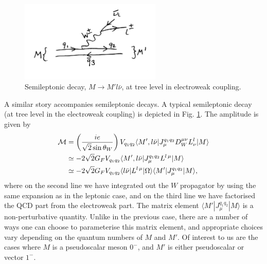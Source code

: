 \begin{figure}
  \vspace{-10pt}
  \begin{center}
    \includegraphics[width=0.6\textwidth]{images/semileptonicdecay.jpg}
  \end{center}
  \vspace{-30pt}
  \caption{Semileptonic decay, $M\to M'l\bar{\nu}$, at tree level in electroweak coupling.}
  \label{fig:semileptonicdecay}
\end{figure}

A similar story accompanies semileptonic decays. A typical semileptonic decay (at tree level in the electroweak coupling) is depicted in Fig. \ref{fig:semileptonicdecay}. The amplitude is given by
\begin{align}
  \nonumber
  \mathcal{M} & = \left( { ie \over \sqrt{2} \sin\theta_W }\right) V_{q_1q_2} \langle M', l\bar{\nu} | J_{\mu}^{q_1q_2} D_W^{\mu\nu} L^l_{\nu} | M \rangle \\
  \nonumber
  & \simeq -2\sqrt{2} G_F V_{q_1q_2} \langle M', l\bar{\nu} | J_{\mu}^{q_1q_2} L^{l\, \mu} | M \rangle \\
  & \simeq -2\sqrt{2} G_F V_{q_1q_2} \langle l\bar{\nu} | L^{l\,\mu} | \Omega \rangle \langle M' | J_{\mu}^{q_1q_2} | M \rangle,
  \label{eq:semileptonic}
\end{align}
where on the second line we have integrated out the $W$ propagator by using the same expansion as in the leptonic case, and on the third line we have factorised the QCD part from the electroweak part. The matrix element $\langle M' | J_{\mu}^{q_1q_2} | M \rangle$ is a non-perturbative quantity. Unlike in the previous case, there are a number of ways one can choose to parameterise this matrix element, and appropriate choices vary depending on the quantum numbers of $M$ and $M'$. Of interest to us are the cases where $M$ is a pseudoscalar meson $0^-$, and $M'$ is either pseudoscalar or vector $1^-$.

